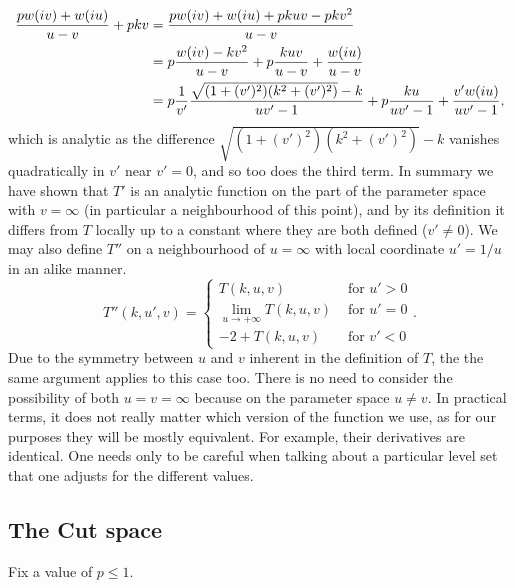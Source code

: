 \begin{align}
\frac{p w(i v) + w(i u)}{u-v} + p k v
&= \frac{pw(i v) + w(i u) + pkuv - pkv^2}{u-v} \\
&= p \frac{w(i v) - kv^2}{u-v} + p \frac{kuv}{u-v} + \frac{w(i u)}{u-v} \\
&= p \frac{1}{v'}\frac{\sqrt{(1+(v')^2)(k^2 + (v')^2)} - k }{uv'-1} + p \frac{ku}{uv'-1} + \frac{v' w(i u)}{uv'-1},
\end{align}
which is analytic as the difference $\sqrt{(1+(v')^2)(k^2 + (v')^2)} - k$ vanishes quadratically in $v'$ near $v'=0$, and so too does the third term. In summary we have shown that $T'$ is an analytic function on the part of the parameter space with $v=\infty$ (in particular a neighbourhood of this point), and by its definition it differs from $T$ locally up to a constant where they are both defined ($v' \neq 0$). We may also define $T''$ on a neighbourhood of $u = \infty$ with local coordinate $u' = 1/u$ in an alike manner.
\[
T''(k,u',v) =
\begin{cases}
T(k,u, v) & \text{ for } u' > 0 \\
\lim_{u\to +\infty} T(k,u,v) & \text{ for } u' = 0 \\
-2 + T(k,u, v) & \text{ for } v' < 0
\end{cases}.
\]
Due to the symmetry between $u$ and $v$ inherent in the definition of $T$, the the same argument applies to this case too. There is no need to consider the possibility of both $u=v=\infty$ because on the parameter space $u\neq v$. In practical terms, it does not really matter which version of the function we use, as for our purposes they will be mostly equivalent. For example, their derivatives are identical. One needs only to be careful when talking about a particular level set that one adjusts for the different values.








\subsection{The Cut space}

Fix a value of $p \leq 1$.


